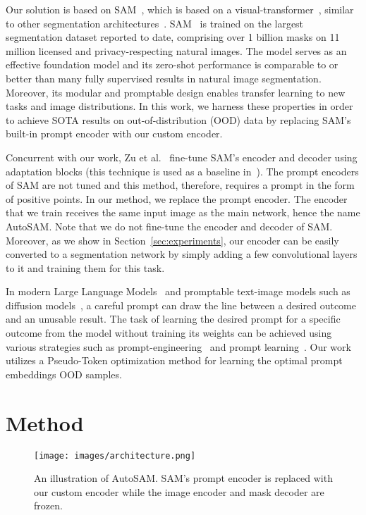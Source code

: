 \documentclass[runningheads]{llncs}
\begin{document}
Our solution is based on SAM~\cite{kirillov2023segment}, which is based on a visual-transformer~\cite{strudel2021segmenter}, similar to other segmentation architectures~\cite{strudel2021segmenter}. SAM~\cite{kirillov2023segment} is trained on the largest segmentation dataset reported to date, comprising over 1 billion masks on 11 million licensed and privacy-respecting natural images. The model serves as an effective foundation model and its zero-shot performance is comparable to or better than many fully supervised results in natural image segmentation. Moreover, its modular and promptable design enables transfer learning to new tasks and image distributions. In this work, we harness these properties in order to achieve SOTA results on out-of-distribution (OOD) data by replacing SAM's built-in prompt encoder with our custom encoder.

Concurrent with our work, Zu et al.~\cite{wu2023medical}
 fine-tune SAM's encoder and decoder using adaptation blocks (this technique is used as a baseline in~\cite{hu2021lora}). The prompt encoders of SAM are not tuned and this method, therefore, requires a prompt in the form of positive points. In our method, we replace the prompt encoder.  The encoder that we train receives the same input image as the main network, hence the name AutoSAM. Note that we do not fine-tune the encoder and decoder of SAM. Moreover, as we show in Section~\ref{sec:experiments}, our encoder can be easily converted to a segmentation network by simply adding a few convolutional layers to it and training them for this task.

In modern Large Language Models~\cite{touvron2023llama} and promptable text-image models such as diffusion models~\cite{ramesh2021zero,saharia2022photorealistic}, a careful prompt can draw the line between a desired outcome and an unusable result. The task of learning the desired prompt for a specific outcome from the model without training its weights can be achieved using various strategies such as prompt-engineering~\cite{shin2020autoprompt} and prompt learning~\cite{wallace2019universal,li2021prefix,gao2020making,liu2021gpt,tewel2021zero,tewel2022zeroshot}. Our work utilizes a Pseudo-Token optimization method for learning the optimal prompt embeddings OOD samples.


\section{Method}

\begin{figure}[t]
    \centering
    \texttt{[image: images/architecture.png]}
    \caption{An illustration of AutoSAM. SAM's prompt encoder is replaced with our custom encoder while the image encoder and mask decoder are frozen.}
    \label{fig:Arch}
\end{figure}
\end{document}
